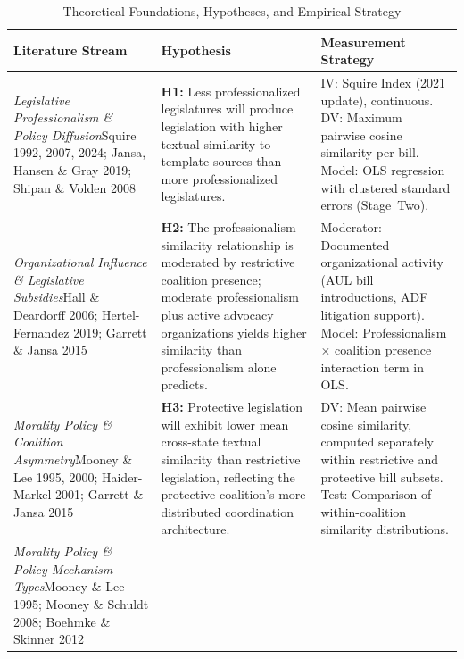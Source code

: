 \clearpage
\begin{table}[!t]
\centering
\caption{Theoretical Foundations, Hypotheses, and Empirical Strategy}
\label{tab:theory_hypotheses}
\renewcommand{\arraystretch}{1.15}
\setlength{\tabcolsep}{5pt}
\scriptsize
\begin{tabular}{@{}>{\raggedright\arraybackslash}p{3.4cm} >{\raggedright\arraybackslash}p{5.6cm} >{\raggedright\arraybackslash}p{4.8cm}@{}}
\toprule
\textbf{Literature Stream} & \textbf{Hypothesis} & \textbf{Measurement Strategy} \\
\midrule
\textit{Legislative Professionalism \& Policy Diffusion}\newline\scriptsize Squire 1992, 2007, 2024; Jansa, Hansen \& Gray 2019; Shipan \& Volden 2008 
& \textbf{H1:} Less professionalized legislatures will produce legislation with higher textual similarity to template sources than more professionalized legislatures. 
& IV: Squire Index (2021 update), continuous. DV: Maximum pairwise cosine similarity per bill. Model: OLS regression with clustered standard errors (Stage~Two). \\
\addlinespace[3pt]
\textit{Organizational Influence \& Legislative Subsidies}\newline\scriptsize Hall \& Deardorff 2006; Hertel-Fernandez 2019; Garrett \& Jansa 2015 
& \textbf{H2:} The professionalism--similarity relationship is moderated by restrictive coalition presence; moderate professionalism plus active advocacy organizations yields higher similarity than professionalism alone predicts. 
& Moderator: Documented organizational activity (AUL bill introductions, ADF litigation support). Model: Professionalism $\times$ coalition presence interaction term in OLS. \\
\addlinespace[3pt]
\textit{Morality Policy \& Coalition Asymmetry}\newline\scriptsize Mooney \& Lee 1995, 2000; Haider-Markel 2001; Garrett \& Jansa 2015 
& \textbf{H3:} Protective legislation will exhibit lower mean cross-state textual similarity than restrictive legislation, reflecting the protective coalition's more distributed coordination architecture. 
& DV: Mean pairwise cosine similarity, computed separately within restrictive and protective bill subsets. Test: Comparison of within-coalition similarity distributions. \\
\addlinespace[3pt]
\textit{Morality Policy \& Policy Mechanism Types}\newline\scriptsize Mooney \& Lee 1995; Mooney \& Schuldt 2008; Boehmke \& Skinner 2012 

\end{tabular}
\end{table}
